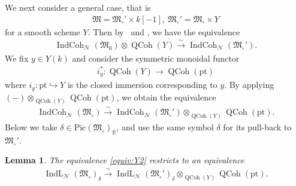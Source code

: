 \documentclass[11pt,oneside,a4paper,mathscr]{amsart}
\newtheorem{lemma}[thm]{Lemma}
\theoremstyle{definition}
\newcommand{\QCoh}{\operatorname{QCoh}}
\newcommand{\IndCoh}{\operatorname{IndCoh}}
\newcommand{\IndL}{\operatorname{IndL}}
\begin{document}
We next consider a general case, that is \begin{align*}\mathfrak{M}=\mathfrak{M}_{\circ}'\times k[-1], \ \mathfrak{M}_{\circ}'=\mathfrak{M}_{\circ}\times Y
\end{align*}
for a 
smooth scheme $Y$. 
Then by~\cite[Corollary~4.2.3]{MR3037900} and \cite[Lemma~4.6.4, Section~8.3]{AG}, 
we have the equivalence 
\begin{align}\label{equiv:Y1}
    \IndCoh_{\mathcal{N}}(\mathfrak{M}_0)\otimes \QCoh(Y) \stackrel{\sim}{\to} \IndCoh_{\mathcal{N}}(\mathfrak{M}_{\circ}'). 
\end{align}
We fix $y\in Y(k)$ and 
consider the symmetric monoidal functor 
\begin{align*}i_y^* \colon \QCoh(Y) \to \QCoh(\mathrm{pt})
\end{align*}
where $i_y \colon \mathrm{pt} \hookrightarrow Y$ is the closed 
immersion corresponding to $y$. By applying $(-)\otimes_{\QCoh(Y)}\QCoh(\mathrm{pt})$, we obtain 
the equivalence 
\begin{align}\label{equiv:Y2}
\IndCoh_{\mathcal{N}}(\mathfrak{M}_{\circ})\stackrel{\sim}{\to}
\IndCoh_{\mathcal{N}}(\mathfrak{M}_{\circ}')\otimes_{\QCoh(Y)}\QCoh(\mathrm{pt}).
\end{align}
Below we take $\delta \in \mathrm{Pic}(\mathfrak{M}_{\circ})_{\mathbb{R}}$, 
and use the same symbol $\delta$ for its pull-back to $\mathfrak{M}_{\circ}'$. 
\begin{lemma}\label{lem:resty}
The equivalence \eqref{equiv:Y2} restricts to an equivalence
\begin{align}\label{equiv:Y3}
\IndL_{\mathcal{N}}(\mathfrak{M}_{\circ})_{\delta}
\stackrel{\sim}{\to}
\IndL_{\mathcal{N}}(\mathfrak{M}_{\circ}')_{\delta}
\otimes_{\QCoh(Y)}
\QCoh(\mathrm{pt}).
\end{align}
\end{lemma}
\end{document}
